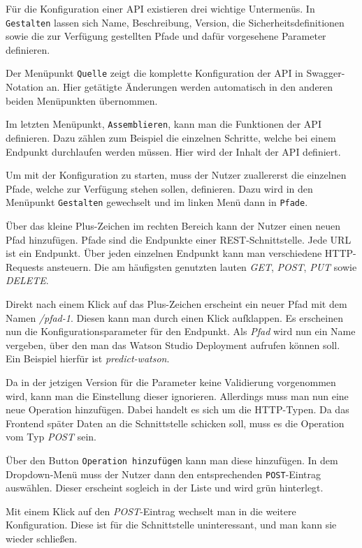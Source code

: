 Für die Konfiguration einer API existieren drei wichtige Untermenüs. In \texttt{Gestalten} lassen sich Name, Beschreibung,
Version, die Sicherheitsdefinitionen sowie die zur Verfügung gestellten Pfade und dafür vorgesehene Parameter definieren.

Der Menüpunkt \texttt{Quelle} zeigt die komplette Konfiguration der API in Swagger-Notation an. Hier getätigte Änderungen
werden automatisch in den anderen beiden Menüpunkten übernommen.

Im letzten Menüpunkt, \texttt{Assemblieren}, kann man die Funktionen der API definieren. Dazu zählen zum Beispiel die
einzelnen Schritte, welche bei einem Endpunkt durchlaufen werden müssen. Hier wird der Inhalt der API definiert.

Um mit der Konfiguration zu starten, muss der Nutzer zuallererst die einzelnen Pfade, welche zur Verfügung stehen
sollen, definieren. Dazu wird in den Menüpunkt \texttt{Gestalten} gewechselt und im linken Menü dann in \texttt{Pfade}.

Über das kleine Plus-Zeichen im rechten Bereich kann der Nutzer einen neuen Pfad hinzufügen. Pfade sind die Endpunkte
einer REST-Schnittstelle. Jede URL ist ein Endpunkt. Über jeden einzelnen Endpunkt kann man verschiedene HTTP-Requests
ansteuern. Die am häufigsten genutzten lauten \textit{GET}, \textit{POST}, \textit{PUT} sowie \textit{DELETE}.

Direkt nach einem Klick auf das Plus-Zeichen erscheint ein neuer Pfad mit dem Namen \textit{/pfad-1}. Diesen kann man
durch einen Klick aufklappen. Es erscheinen nun die Konfigurationsparameter für den Endpunkt. Als \textit{Pfad} wird nun
ein Name vergeben, über den man das Watson Studio Deployment aufrufen können soll. Ein Beispiel hierfür ist
\textit{predict-watson}.

Da in der jetzigen Version für die Parameter keine Validierung vorgenommen wird, kann man die Einstellung dieser
ignorieren. Allerdings muss man nun eine neue Operation hinzufügen. Dabei handelt es sich um die HTTP-Typen. Da das
Frontend später Daten an die Schnittstelle schicken soll, muss es die Operation vom Typ \textit{POST} sein.

Über den Button \texttt{Operation hinzufügen} kann man diese hinzufügen. In dem Dropdown-Menü muss der Nutzer dann den
entsprechenden \texttt{POST}-Eintrag auswählen. Dieser erscheint sogleich in der Liste und wird grün hinterlegt.

Mit einem Klick auf den \textit{POST}-Eintrag wechselt man in die weitere Konfiguration. Diese ist für die Schnittstelle
uninteressant, und man kann sie wieder schließen.

